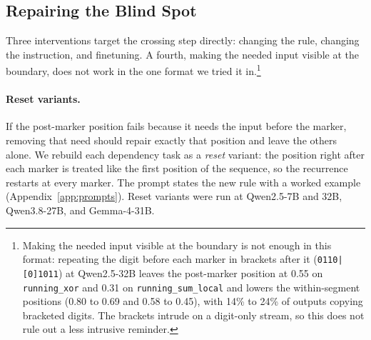 \documentclass[10pt]{article} %
\newcommand{\task}[1]{\texttt{#1}}
\begin{document}
\begin{table}[!htbp]
\centering
\small
\caption{What the delimiter has to be ($N = 64$, $k = 4$, 20 trials per cell, digit tasks). A space kept in the answer matches the bar; a space that segments the input while the answer is written unbroken is worse than no delimiter. Accuracy with the change against the no-delimiter run in brackets. Whitespace and markers are stripped from both sides before scoring, so a run whose answer carries no separator is not penalised for that.}
\label{tab:delimvar}

\end{table}

\subsection{Repairing the Blind Spot}
\label{sec:repair}

Three interventions target the crossing step directly: changing the rule, changing the instruction, and finetuning. A fourth, making the needed input visible at the boundary, does not work in the one format we tried it in.\footnote{\label{fn:reminder}Making the needed input visible at the boundary is not enough in this format: repeating the digit before each marker in brackets after it (\texttt{0110|[0]1011}) at Qwen2.5-32B leaves the post-marker position at 0.55 on \task{running\_xor} and 0.31 on \task{running\_sum\_local} and lowers the within-segment positions (0.80 to 0.69 and 0.58 to 0.45), with 14\% to 24\% of outputs copying bracketed digits. The brackets intrude on a digit-only stream, so this does not rule out a less intrusive reminder.}

\paragraph{Reset variants.}
\label{sec:reset}
If the post-marker position fails because it needs the input before the marker, removing that need should repair exactly that position and leave the others alone. We rebuild each dependency task as a \emph{reset} variant: the position right after each marker is treated like the first position of the sequence, so the recurrence restarts at every marker. The prompt states the new rule with a worked example (Appendix~\ref{app:prompts}). Reset variants were run at Qwen2.5-7B and 32B, Qwen3.8-27B, and Gemma-4-31B.
\end{document}
